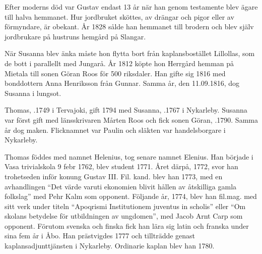 %
Efter moderns död var Gustav endast 13 år när han genom testamente blev ägare till halva hemmanet. Hur jordbruket sköttes, av drängar och pigor eller av förmyndare, är obekant. År 1828 sålde han hemmanet till brodern och blev själv jordbrukare på hustruns hemgård på Slangar.


%
När Susanna blev änka måste hon flytta bort från kaplansbostället Lillollas, som de bott i parallellt med Jungarå. År 1812 köpte hon Herrgård hemman på Mietala till sonen Göran Roos för 500 riksdaler. Han gifte sig 1816 med bonddottern Anna Henriksson från Gunnar. Samma år, den 11.09.1816, dog Susanna i lungsot.


%
Thomas, .1749 i Tervajoki, gift 1794 med Susanna, .1767 i Nykarleby. Susanna var först gift med länsskrivaren Mårten Roos och fick sonen Göran, .1790. Samma år dog maken. Flicknamnet var Paulin och släkten var handelsborgare i 	Nykarleby.
\begin{jhchildren}
  \item {}
  \item {}
  \item {}
  \item {}
  \item {}
  \item {}
  \item {}
  \item {}
\end{jhchildren}
Thomas föddes med namnet Helenius, tog senare namnet Elenius. Han började i Vasa trivialskola 9 febr 1762, blev student 1771. Året därpå, 1772, svor han trohetseden inför konung Gustav III. Fil. kand. blev han 1773, med en avhandlingen ``Det värde varuti ekonomien blivit hållen av åtskilliga gamla folkslag'' med Pehr Kalm som opponent. Följande år, 1774, blev han fil.mag. med sitt verk under titeln ``Apoqrismi Institutionem juventus in scholis'' eller ``Om skolans betydelse för utbildningen av ungdomen'', med Jacob Arnt Carp som opponent. Förutom svenska och finska fick han lära sig latin och franska under sina fem år i Åbo. Han prästvigdes 1777 och tillträdde genast kaplansadjunttjänsten i Nykarleby. Ordinarie kaplan blev han 1780.

